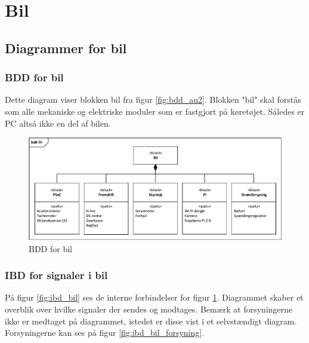 \section{Bil}

\subsection{Diagrammer for bil}

\subsubsection{BDD for bil} %

Dette diagram viser blokken bil fra figur \ref{fig:bdd_au2}. Blokken "bil" skal forstås som alle mekaniske og elektriske moduler som er fastgjort på køretøjet. Således er PC altså ikke en del af bilen.

\begin{figure}[h]
\centering
\includegraphics[width=\textwidth]{../fig/diagrammer/bil/bdd_bil.pdf}
\caption{BDD for bil}
\label{fig:bdd_bil}
\end{figure}
\clearpage

\subsubsection{IBD for signaler i bil}

På figur \ref{fig:ibd_bil} ses de interne forbindelser for figur \ref{fig:bdd_bil}. Diagrammet skaber et overblik over hvilke signaler der sendes og modtages. Bemærk at forsyningerne ikke er medtaget på diagrammet, istedet er disse vist i et selvstændigt diagram. Forsyningerne kan ses på figur \ref{fig:ibd_bil_forsyning}.


